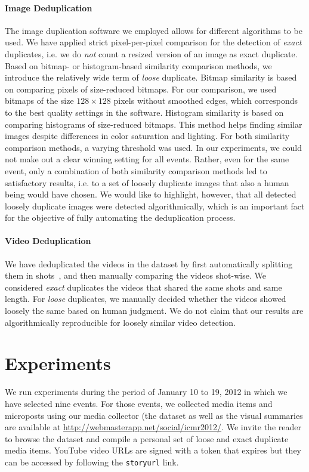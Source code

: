 \paragraph{Image Deduplication}
The image duplication software we employed allows for different algorithms to be used. We have applied strict pixel-per-pixel comparison for the detection of \emph{exact} duplicates, i.e. we do \emph{not} count a resized version of an image as exact duplicate. Based on bitmap- or histogram-based similarity comparison methods, we introduce the relatively wide term of \emph{loose} duplicate. Bitmap similarity is based on comparing pixels of size-reduced bitmaps.
For our comparison, we used bitmaps of the size $128 \times 128$ pixels without smoothed edges, which corresponds to the best quality settings in the software.
Histogram similarity is based on comparing histograms of size-reduced bitmaps. This method helps finding similar images despite differences in color saturation and lighting. For both similarity comparison methods, a varying threshold was used. In our experiments, we could not make out a clear winning setting for all events. Rather, even for the same event, only a combination of both similarity comparison methods led to satisfactory results, i.e. to a set of loosely duplicate images that also a human being would have chosen. We would like to highlight, however, that all detected loosely duplicate images were detected algorithmically, which is an important fact for the objective of fully automating the deduplication process.

\paragraph{Video Deduplication}
We have deduplicated the videos in the dataset by first automatically splitting them in shots~\cite{CrowdsourcingEvent}, and then manually comparing the videos shot-wise. We considered \emph{exact} duplicates the videos that shared the same shots and same length. For \emph{loose} duplicates, we manually decided whether the videos showed loosely the same based on human judgment. We do not claim that our results are algorithmically reproducible for loosely similar video detection.


\section{Experiments}                                                       \label{sec:experiments}
We run experiments during the period of January 10 to 19, 2012 in which we have selected nine events. For those events, we collected media items and microposts using our media collector (the dataset as well as the visual summaries are available at \url{http://webmasterapp.net/social/icmr2012/}. We invite the reader to browse the dataset and compile a personal set of loose and exact duplicate media items. YouTube video URLs are signed with a token that expires but they can be accessed by following the \texttt{storyurl} link.

